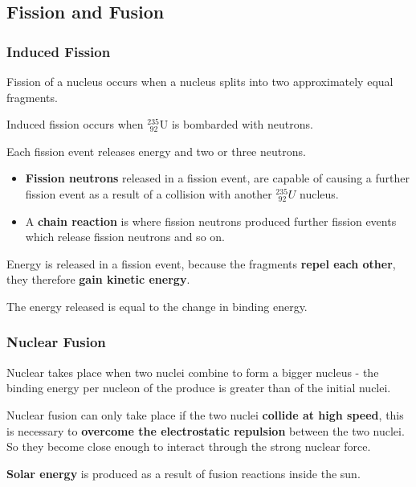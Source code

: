 \subsection{Fission and Fusion}

\subsubsection*{Induced Fission}

Fission of a nucleus occurs when a nucleus splits into two approximately equal fragments.

Induced fission occurs when $^{235}_{\hspace{4pt}92}\text{U}$ is bombarded with neutrons.

Each fission event releases energy and two or three neutrons.
\begin{itemize}
    \item \textbf{Fission neutrons} released in a fission event, are capable of causing a further fission event as a result of a collision with another $^{235}_{\hspace{4pt}92}U$ nucleus.
    \item A \textbf{chain reaction} is where fission neutrons produced further fission events which release fission neutrons and so on.
\end{itemize}

Energy is released in a fission event, because the fragments \textbf{repel each other}, they therefore \textbf{gain kinetic energy}.

The energy released is equal to the change in binding energy.

\subsubsection*{Nuclear Fusion}

Nuclear takes place when two nuclei combine to form a bigger nucleus - the binding energy per nucleon of the produce is greater than of the initial nuclei.

Nuclear fusion can only take place if the two nuclei \textbf{collide at high speed}, this is necessary to \textbf{overcome the electrostatic repulsion} between the two nuclei. So they become close enough to interact through the strong nuclear force.

\textbf{Solar energy} is produced as a result of fusion reactions inside the sun.
